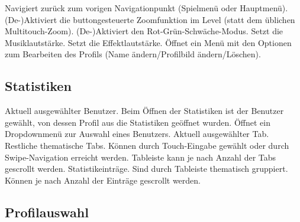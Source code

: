 \begin{requirements}
 Navigiert zurück zum vorigen Navigationpunkt (Spielmenü oder Hauptmenü).
 (De-)Aktiviert die buttongesteuerte Zoomfunktion im Level (statt dem üblichen Multitouch-Zoom).
 (De-)Aktiviert den Rot-Grün-Schwäche-Modus.
 Setzt die Musiklautstärke.
 Setzt die Effektlautstärke.
 Öffnet ein Menü mit den Optionen zum Bearbeiten des Profils (Name ändern/Profilbild ändern/Löschen).
\end{requirements}

\subsection{Statistiken}

\begin{center}
\setlength\fboxsep{20pt}
\setlength\fboxrule{1pt}
\end{center}

\begin{requirements}
 Aktuell ausgewählter Benutzer. Beim Öffnen der Statistiken ist der Benutzer gewählt, von dessen Profil aus die Statistiken geöffnet wurden. Öffnet ein Dropdownmenü zur Auswahl eines Benutzers.
 Aktuell ausgewählter Tab.
 Restliche thematische Tabs. Können durch Touch-Eingabe gewählt oder durch Swipe-Navigation erreicht werden. Tableiste kann je nach Anzahl der Tabs gescrollt werden.
 Statistikeinträge. Sind durch Tableiste thematisch gruppiert. Können je nach Anzahl der Einträge gescrollt werden.
\end{requirements}

\subsection{Profilauswahl}

